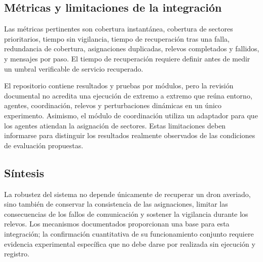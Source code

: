 \subsection{Métricas y limitaciones de la integración}

Las métricas pertinentes son cobertura instantánea, cobertura de sectores prioritarios, tiempo sin vigilancia, tiempo de recuperación tras una falla, redundancia de cobertura, asignaciones duplicadas, relevos completados y fallidos, y mensajes por paso. El tiempo de recuperación requiere definir antes de medir un umbral verificable de servicio recuperado.

El repositorio contiene resultados y pruebas por módulos, pero la revisión documental no acredita una ejecución de extremo a extremo que reúna entorno, agentes, coordinación, relevos y perturbaciones dinámicas en un único experimento. Asimismo, el módulo de coordinación utiliza un adaptador para que los agentes atiendan la asignación de sectores. Estas limitaciones deben informarse para distinguir los resultados realmente observados de las condiciones de evaluación propuestas.

\subsection{Síntesis}

La robustez del sistema no depende únicamente de recuperar un dron averiado, sino también de conservar la consistencia de las asignaciones, limitar las consecuencias de los fallos de comunicación y sostener la vigilancia durante los relevos. Los mecanismos documentados proporcionan una base para esta integración; la confirmación cuantitativa de su funcionamiento conjunto requiere evidencia experimental específica que no debe darse por realizada sin ejecución y registro.
